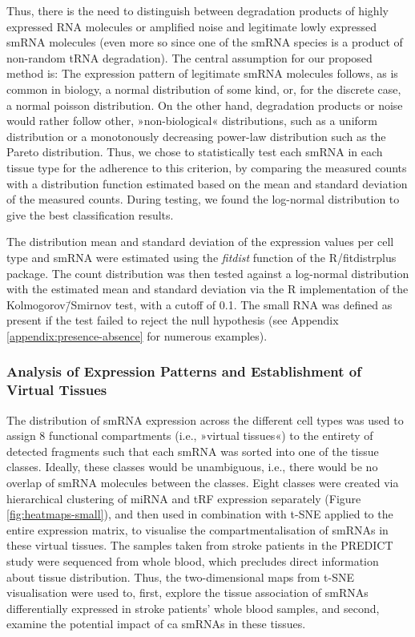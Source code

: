 \begin{method}
Thus, there is the need to distinguish between degradation products of highly expressed RNA molecules or amplified noise and legitimate lowly expressed smRNA molecules (even more so since one of the smRNA species is a product of non-random tRNA degradation). The central assumption for our proposed method is: The expression pattern of legitimate smRNA molecules follows, as is common in biology, a normal distribution of some kind, or, for the discrete case, a normal poisson distribution. On the other hand, degradation products or noise would rather follow other, »non-biological« distributions, such as a uniform distribution or a monotonously decreasing power-law distribution such as the Pareto distribution. Thus, we chose to statistically test each smRNA in each tissue type for the adherence to this criterion, by comparing the measured counts with a distribution function estimated based on the mean and standard deviation of the measured counts. During testing, we found the log-normal distribution to give the best classification results.
 
The distribution mean and standard deviation of the expression values per cell type and smRNA were estimated using the \emph{fitdist} function of the R/fitdistrplus package.\cite{Delignette-Muller2015} The count distribution was then tested against a log-normal distribution with the estimated mean and standard deviation via the R implementation of the Kolmogorov\=/Smirnov test, with a cutoff of 0.1. The small RNA was defined as present if the test failed to reject the null hypothesis (see Appendix \ref{appendix:presence-absence} for numerous examples).

\subsubsection{Analysis of Expression Patterns and Establishment of Virtual Tissues}
The distribution of smRNA expression across the different cell types was used to assign 8 functional compartments (i.e., »virtual tissues«) to the entirety of detected fragments such that each smRNA was sorted into one of the tissue classes. Ideally, these classes would be unambiguous, i.e., there would be no overlap of smRNA molecules between the classes. Eight classes were created via hierarchical clustering of miRNA and tRF expression separately (Figure \ref{fig:heatmaps-small}), and then used in combination with t-SNE applied to the entire expression matrix, to visualise the compartmentalisation of smRNAs in these virtual tissues. The samples taken from stroke patients in the PREDICT study were sequenced from whole blood, which precludes direct information about tissue distribution. Thus, the two-dimensional maps from t-SNE visualisation were used to, first, explore the tissue association of smRNAs differentially expressed in stroke patients' whole blood samples, and second, examine the potential impact of \acl{ca} smRNAs in these tissues.

\end{method}

